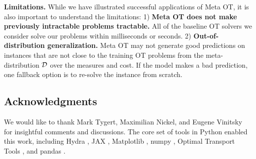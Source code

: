 \documentclass{article}
\begin{document}
\textbf{Limitations.}
While we have illustrated successful applications of Meta OT,
it is also important to understand the limitations:
1) \textbf{Meta OT does not make previously intractable
problems tractable.}
All of the baseline OT solvers we consider solve
our problems within milliseconds or seconds.
2) \textbf{Out-of-distribution generalization.}
Meta OT may not generate good predictions on instances
that are not close to the training OT problems from the
meta-distribution ${\mathcal{D}}$ over the measures and cost.
If the model makes a bad prediction,
one fallback option is to re-solve the instance from scratch.


\subsection*{Acknowledgments}
We would like to thank Mark Tygert, Maximilian Nickel,
and Eugene Vinitsky for insightful comments and discussions.
The core set of tools in Python
\citep{van1995python,oliphant2007python}
enabled this work, including
Hydra \citep{Yadan2019Hydra},
JAX \citep{jax2018github},
Matplotlib \citep{hunter2007matplotlib},
numpy \citep{oliphant2006guide,van2011numpy},
Optimal Transport Tools \citep{cuturi2022optimal},
and pandas \citep{mckinney2012python}.

{\small


}

\iffalse
\end{document}
